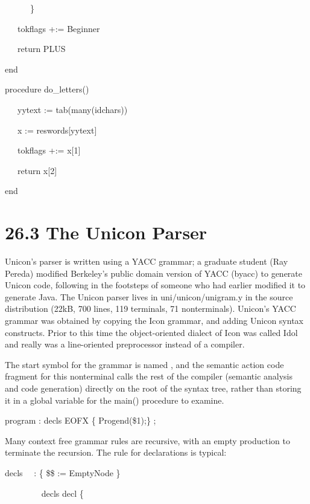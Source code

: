{\ttfamily\mdseries
\ \ \ \ \ \ \}}

{\ttfamily\mdseries
\ \ \ tokflags +:= Beginner}

{\ttfamily\mdseries
\ \ \ return PLUS}

{\ttfamily\mdseries
end}


\bigskip

{\ttfamily\mdseries
procedure do\_letters()}

{\ttfamily\mdseries
\ \ \ yytext {\textbar}{\textbar}:= tab(many(idchars))}

{\ttfamily\mdseries
\ \ \ x := reswords[yytext]}

{\ttfamily\mdseries
\ \ \ tokflags +:= x[1]}

{\ttfamily\mdseries
\ \ \ return x[2]}

{\ttfamily\mdseries
end}

\section[26.3 The Unicon Parser]{26.3 The Unicon Parser}

Unicon's parser is written using a YACC grammar; a graduate student
(Ray Pereda) modified Berkeley's public domain version of YACC (byacc)
to generate Unicon code, following in the footsteps of someone who had
earlier modified it to generate Java. The Unicon parser lives in
uni/unicon/unigram.y in the source distribution (22kB, 700 lines, 119
terminals, 71 nonterminals). Unicon's YACC grammar was obtained by
copying the Icon grammar, and adding Unicon syntax constructs. Prior
to this time the object-oriented dialect of Icon was called Idol and
really was a line-oriented preprocessor instead of a compiler.

The start symbol for the grammar is named
, and the semantic action code fragment
for this nonterminal calls the rest of the compiler (semantic analysis
and code generation) directly on the root of the syntax tree, rather
than storing it in a global variable for the main() procedure to
examine.

{\ttfamily\mdseries
program : decls EOFX \{ Progend(\$1);\} ;}


Many context free grammar rules are recursive, with an empty
production to terminate the recursion. The rule for declarations is
typical:

{\ttfamily\mdseries
decls \ \ : \{ \$\$ := EmptyNode \}}

{\ttfamily\mdseries
\ \ \ \ \ \ \ \ {\textbar} decls decl \{}

